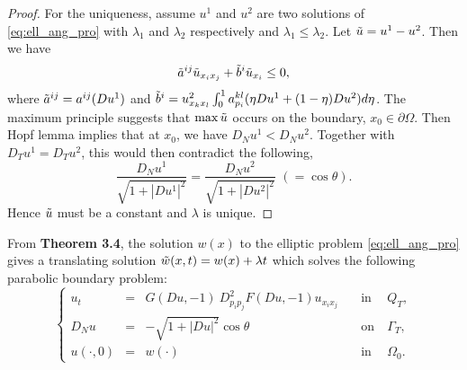 \documentclass[12pt]{article}
\numberwithin{equation}{section}
\theoremstyle{plain}
\theoremstyle{definition}
\theoremstyle{remark}
\begin{document}
\begin{proof}
For the uniqueness, assume $u^1$ and $u^2$ are two solutions of \eqref{eq:ell_ang_pro} with $\lambda_1$ and $\lambda_2$ respectively and $\lambda_1 \leq \lambda_2$. Let $\Tilde{u}=u^1 - u^2$. Then we have
\begin{equation*}
    \Tilde{a}^{ij} \Tilde{u}_{x_i x_j} + \Tilde{b}^{i} \Tilde{u}_{x_i} \leq 0,
\end{equation*}
where $\Tilde{a}^{ij} = a^{ij} (Du^1)$ and $\Tilde{b}^{i} = u^2_{x_k x_l} \int^1_0 a^{kl}_{p_i} (\eta Du^1 + (1-\eta) Du^2 ) d\eta $. The maximum principle suggests that 
$\max \Tilde{u}$ occurs on the boundary, $x_0 \in \partial \Omega$. Then Hopf lemma implies that at $x_0$, we have $D_N u^1 < D_N u^2$. Together with $D_T u^1 = D_T u^2$, this would then contradict the following,  
\begin{equation*}
    \frac{D_N u^1}{\sqrt{1+|D u^1|^2}} =  \frac{D_N u^2}{\sqrt{1+|D u^2|^2}}
    \,\,(=\cos\theta).
\end{equation*}
Hence $\Tilde{u}$ must be a constant and $\lambda$ is unique.
\end{proof} 
From \textbf{Theorem 3.4}, the solution $w(x)$ to the elliptic problem \eqref{eq:ell_ang_pro} gives a translating solution $\Tilde{w}(x,t) = w(x) + \lambda t$ which solves the following parabolic boundary problem:
\begin{equation} 
    \left\{ \begin{array}{cllcl}
            u_t & = & G(Du,-1) \  D^2_{p_i p_j} F (Du,-1) u_{x_i x_j}   \quad &  \text{in} & \ Q_T, \\
            D_N u & = & - \sqrt{1+|Du|^2} \cos \theta  \quad &  \text{on} & \ \Gamma_T,  \\
         u(\cdot,0) & = & w(\cdot)  \quad \ & \text{in} & \   \Omega_0.
    \end{array}  \right.
\end{equation}
\end{document}
